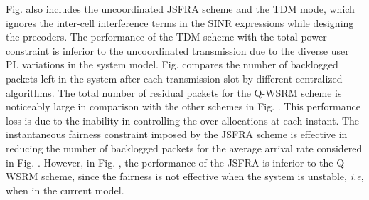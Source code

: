 Fig.  also includes the uncoordinated  \ac{JSFRA} scheme and the \ac{TDM} mode, which ignores the inter-cell interference terms in the \ac{SINR} expressions while designing the precoders. The performance of the \ac{TDM} scheme with the total power constraint is inferior to the uncoordinated transmission due to the diverse user \ac{PL} variations in the system model. Fig.  compares the number of backlogged packets left in the system after each transmission slot by different centralized algorithms. The total number of residual packets for the \ac{Q-WSRM} scheme is noticeably large in comparison with the other schemes in Fig. . This performance loss is due to the inability in controlling the over-allocations at each instant. The instantaneous fairness constraint imposed by the \me{\ell_\infty} \ac{JSFRA} scheme is effective in reducing the number of backlogged packets for the average arrival rate considered in Fig. . However, in Fig. , the performance of the \me{\ell_\infty} \ac{JSFRA} is inferior to the \ac{Q-WSRM} scheme, since the fairness is not effective when the system is unstable, \textit{i.e}, when  in the current model.
